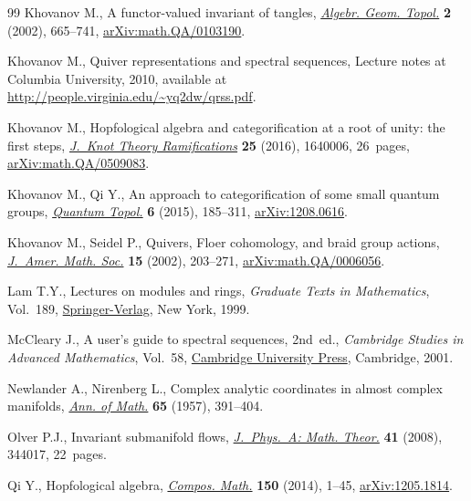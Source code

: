 \begin{thebibliography}{99}
Khovanov M., A functor-valued invariant of tangles, \href{https://doi.org/10.2140/agt.2002.2.665}{\textit{Algebr. Geom.
 Topol.}} \textbf{2} (2002), 665--741, \href{https://arxiv.org/abs/math.QA/0103190}{arXiv:math.QA/0103190}.

Khovanov M., Quiver representations and spectral sequences, {L}ecture notes at
 Columbia University, 2010, available at
 \url{http://people.virginia.edu/~yq2dw/qrss.pdf}.

Khovanov M., Hopfological algebra and categorification at a root of unity: the
 first steps, \href{https://doi.org/10.1142/S021821651640006X}{\textit{J.~Knot Theory Ramifications}} \textbf{25} (2016),
 1640006, 26~pages, \href{https://arxiv.org/abs/math.QA/0509083}{arXiv:math.QA/0509083}.

Khovanov M., Qi Y., An approach to categorification of some small quantum
 groups, \href{https://doi.org/10.4171/QT/63}{\textit{Quantum Topol.}} \textbf{6} (2015), 185--311,
 \href{https://arxiv.org/abs/1208.0616}{arXiv:1208.0616}.

Khovanov M., Seidel P., Quivers, {F}loer cohomology, and braid group actions,
 \href{https://doi.org/10.1090/S0894-0347-01-00374-5}{\textit{J.~Amer. Math. Soc.}} \textbf{15} (2002), 203--271, \href{https://arxiv.org/abs/math.QA/0006056}{arXiv:math.QA/0006056}.

Lam T.Y., Lectures on modules and rings, \textit{Graduate Texts in
 Mathematics}, Vol.~189, \href{https://doi.org/10.1007/978-1-4612-0525-8}{Springer-Verlag}, New York, 1999.

McCleary J., A user's guide to spectral sequences, 2nd~ed., \textit{Cambridge Studies in
 Advanced Mathematics}, Vol.~58, \href{https://doi.org/10.1017/CBO9780511626289}{Cambridge University Press}, Cambridge, 2001.

Newlander A., Nirenberg L., Complex analytic coordinates in almost complex
 manifolds, \href{https://doi.org/10.2307/1970051}{\textit{Ann. of Math.}} \textbf{65} (1957), 391--404.

Olver P.J., Invariant submanifold flows, \href{https://doi.org/10.1088/1751-8113/41/34/344017}{\textit{J.~Phys.~A: Math. Theor.}}
 \textbf{41} (2008), 344017, 22~pages.

Qi Y., Hopfological algebra, \href{https://doi.org/10.1112/S0010437X13007380}{\textit{Compos. Math.}} \textbf{150} (2014), 1--45,
 \href{https://arxiv.org/abs/1205.1814}{arXiv:1205.1814}.


\end{thebibliography}
